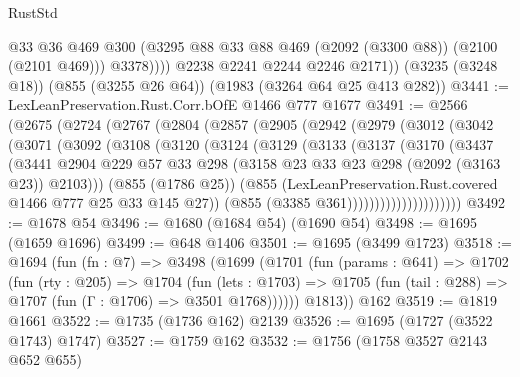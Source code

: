 \begin{lexlean}{RustStd}
\begin{coremodule}
                @33
                @36
                @469
                @300
                (@3295 @88 @33 @88 @469 (@2092 (@3300 @88)) (@2100 (@2101 @469)))
                @3378))))
        @2238
        @2241
        @2244
        @2246
        @2171))
    (@3235 (@3248 @18))
    (@855 (@3255 @26 @64))
    (@1983 (@3264 @64 @25 @413 @282))
@3441 := LexLeanPreservation.Rust.Corr.bOfE @1466 @777 @1677
@3491 := @2566
    (@2675
      (@2724
        (@2767
          (@2804
            (@2857
              (@2905
                (@2942
                  (@2979
                    (@3012
                      (@3042
                        (@3071
                          (@3092
                            (@3108
                              (@3120
                                (@3124
                                  (@3129
                                    (@3133
                                      (@3137
                                        (@3170
                                          (@3437
                                            (@3441
                                              @2904
                                              @229
                                              @57
                                              @33
                                              @298
                                              (@3158 @23 @33 @23 @298 (@2092 (@3163 @23)) @2103)))
                                          (@855 (@1786 @25))
                                          (@855
                                            (LexLeanPreservation.Rust.covered
                                              @1466
                                              @777
                                              @25
                                              @33
                                              @145
                                              @27))
                                          (@855 (@3385 @361)))))))))))))))))))))
@3492 := @1678 @54
@3496 := @1680 (@1684 @54) (@1690 @54)
@3498 := @1695 (@1659 @1696)
@3499 := @648 @1406
@3501 := @1695 (@3499 @1723)
@3518 := @1694
    (fun (fn : @7) =>
    @3498
      (@1699
        (@1701
          (fun (params : @641) =>
          @1702
            (fun (rty : @205) =>
            @1704
              (fun (lets : @1703) =>
              @1705 (fun (tail : @288) => @1707 (fun (Γ : @1706) => @3501 @1768))))))
        @1813))
    @162
@3519 := @1819 @1661
@3522 := @1735 (@1736 @162) @2139
@3526 := @1695 (@1727 (@3522 @1743) @1747)
@3527 := @1759 @162
@3532 := @1756 (@1758 @3527 @2143 @652 @655)

\end{coremodule}
\end{lexlean}
